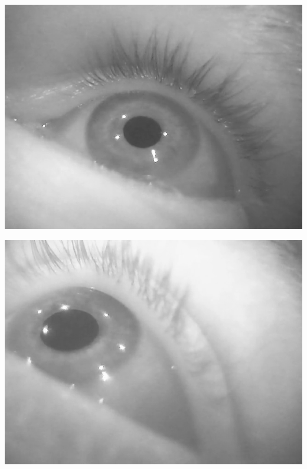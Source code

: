 \documentclass[Bachelorarbeit.tex]{subfiles}
\begin{document}
\begin{center}
	
\begin{minipage}{0.48\linewidth}
\includegraphics[width=\linewidth]{Images/no_blink_snap.png}

\end{minipage}
\begin{minipage}{0.48\linewidth}
\includegraphics[width=\linewidth]{Images/part_missing.png}
\end{minipage}
\end{center}
\end{document}

